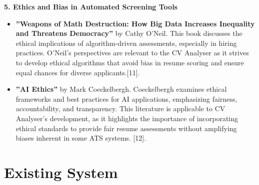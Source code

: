 \documentclass[12pt,a4paper]{report}
\begin{document}
\textbf{5. Ethics and Bias in Automated Screening Tools}

\begin{itemize} \item \textbf{”Weapons of Math Destruction: How Big Data Increases Inequality and Threatens Democracy”} by Cathy O'Neil. This book discusses the ethical implications of algorithm-driven assessments, especially in hiring practices. O'Neil's perspectives are relevant to the CV Analyser as it strives to develop ethical algorithms that avoid bias in resume scoring and ensure equal chances for diverse applicants.[11].

\item \textbf{”AI Ethics”} by Mark Coeckelbergh. Coeckelbergh examines ethical frameworks and best practices for AI applications, emphasizing fairness, accountability, and transparency. This literature is applicable to CV Analyser’s development, as it highlights the importance of incorporating ethical standards to provide fair resume assessments without amplifying biases inherent in some ATS systems. [12]. \end{itemize}
\chapter{Existing System}
\end{document}
